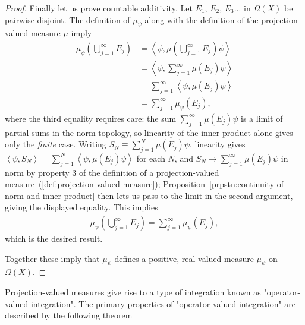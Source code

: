 \begin{proof}
Finally let us prove countable additivity. Let $E_1$, $E_2$, $E_3$... in $\Omega(X)$ be pairwise disjoint. The definition of $\mu_\psi$ along with the definition of the projection-valued measure $\mu$ imply
\begin{align}
    \mu_\psi \left( \bigcup_{j = 1}^{\infty} E_j \right) &= \left< \psi, \mu \left( \bigcup_{j = 1}^{\infty} E_j \right) \psi \right>  \\
                                                         &= \left< \psi, \sum_{j = 1}^{\infty} \mu(E_j) \psi \right>  \\
                                                         &= \sum_{j = 1}^{\infty} \left< \psi, \mu(E_j) \psi \right>  \\
                                                         &= \sum_{j = 1}^{\infty} \mu_\psi(E_j),
\end{align}
where the third equality requires care: the sum $\sum_{j=1}^\infty \mu(E_j)\psi$ is a limit of partial sums in the norm topology, so linearity of the inner product alone gives only the \textit{finite} case. Writing $S_N \equiv \sum_{j=1}^N \mu(E_j)\psi$, linearity gives $\left< \psi, S_N \right> = \sum_{j=1}^N \left< \psi, \mu(E_j)\psi \right>$ for each $N$, and $S_N \to \sum_{j=1}^\infty \mu(E_j)\psi$ in norm by property 3 of the definition of a projection-valued measure~(\ref{def:projection-valued-measure}); Proposition~\ref{prpstn:continuity-of-norm-and-inner-product} then lets us pass to the limit in the second argument, giving the displayed equality. This implies
\begin{align}
    \mu_\psi \left( \bigcup_{j = 1}^{\infty} E_j \right) = \sum_{j = 1}^{\infty} \mu_\psi(E_j),
\end{align}
which is the desired result.

Together these imply that $\mu_\psi$ defines a positive, real-valued measure $\mu_\psi$ on $\Omega(X)$.
\end{proof}

Projection-valued measures give rise to a type of integration known as "operator-valued integration". The primary properties of "operator-valued integration" are described by the following theorem

